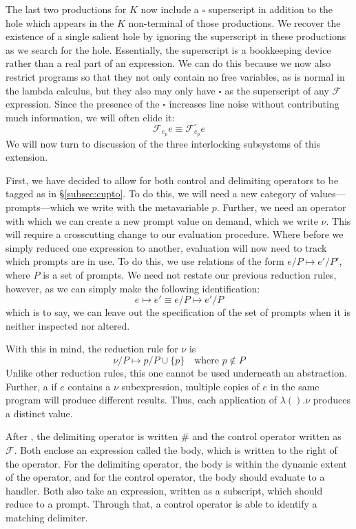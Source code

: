 \documentclass[11pt]{article}
\newcommand\F{\mathcal{F}}
\begin{document}
The last two productions for $K$ now include a $\square$ superscript in addition to the hole which appears in the $K$ non-terminal of those productions.
We recover the existence of a single salient hole by ignoring the superscript in these productions as we search for the hole.
Essentially, the superscript is a bookkeeping device rather than a real part of an expression.
We can do this because we now also restrict programs so that they not only contain no free variables, as is normal in the lambda calculus, but they also may only have $\square$ as the superscript of any $\F$ expression.
Since the presence of the $\square$ increases line noise without contributing much information, we will often elide it:
$$\F_{e_p}e \equiv \F_{e_p}^{\square}e$$
We will now turn to discussion of the three interlocking subsystems of this extension.

First, we have decided to allow for both control and delimiting operators to be tagged as in \S\ref{subsec:cupto}.
To do this, we will need a new category of values---prompts---which we write with the metavariable $p$.
Further, we need an operator with which we can create a new prompt value on demand, which we write $\nu$.
This will require a crosscutting change to our evaluation procedure.
Where before we simply reduced one expression to another, evaluation will now need to track which prompts are in use.
To do this, we use relations of the form $e/P \mapsto e'/P'$, where $P$ is a set of prompts.
We need not restate our previous reduction rules, however, as we can simply make the following identification:
$$e \mapsto e' \equiv e/P \mapsto e'/P$$
which is to say, we can leave out the specification of the set of prompts when it is neither inspected nor altered.

With this in mind, the reduction rule for $\nu$ is
$$\nu/P \mapsto p/P\cup\{p\} \quad\textrm{where }p \notin P$$
Unlike other reduction rules, this one cannot be used underneath an abstraction.
Further, a if $e$ contains a $\nu$ subexpression, multiple copies of $e$ in the same program will produce different results.
Thus, each application of $\lambda().\nu$ produces a distinct value.


After \cite{PromptApplication}, the delimiting operator is written $\#$ and the control operator written as $\F$.
Both enclose an expression called the body, which is written to the right of the operator.
For the delimiting operator, the body is within the dynamic extent of the operator, and for the control operator, the body should evaluate to a handler.
Both also take an expression, written as a subscript, which should reduce to a prompt. Through that, a control operator is able to identify a matching delimiter.
\end{document}
